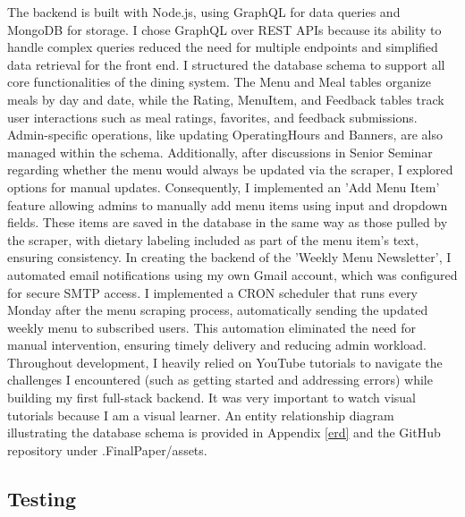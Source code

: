 \documentclass[10pt,twocolumn]{article}
\begin{document}
The backend is built with Node.js, using GraphQL for data queries and MongoDB for storage. I chose GraphQL over REST APIs because its ability to handle complex queries reduced the need for multiple endpoints and simplified data retrieval for the front end. I structured the database schema to support all core functionalities of the dining system. The Menu and Meal tables organize meals by day and date, while the Rating, MenuItem, and Feedback tables track user interactions such as meal ratings, favorites, and feedback submissions. Admin-specific operations, like updating OperatingHours and Banners, are also managed within the schema. Additionally, after discussions in Senior Seminar regarding whether the menu would always be updated via the scraper, I explored options for manual updates. Consequently, I implemented an 'Add Menu Item' feature allowing admins to manually add menu items using input and dropdown fields. These items are saved in the database in the same way as those pulled by the scraper, with dietary labeling included as part of the menu item's text, ensuring consistency. In creating the backend of the 'Weekly Menu Newsletter', I automated email notifications using my own Gmail account, which was configured for secure SMTP access. I implemented a CRON scheduler that runs every Monday after the menu scraping process, automatically sending the updated weekly menu to subscribed users. This automation eliminated the need for manual intervention, ensuring timely delivery and reducing admin workload. Throughout development, I heavily relied on YouTube tutorials to navigate the challenges I encountered (such as getting started and addressing errors) while building my first full-stack backend. It was very important to watch visual tutorials because I am a visual learner. An entity relationship diagram illustrating the database schema is provided in Appendix \ref{erd} and the GitHub repository under .FinalPaper/assets. 

\subsection{Testing}
\end{document}
